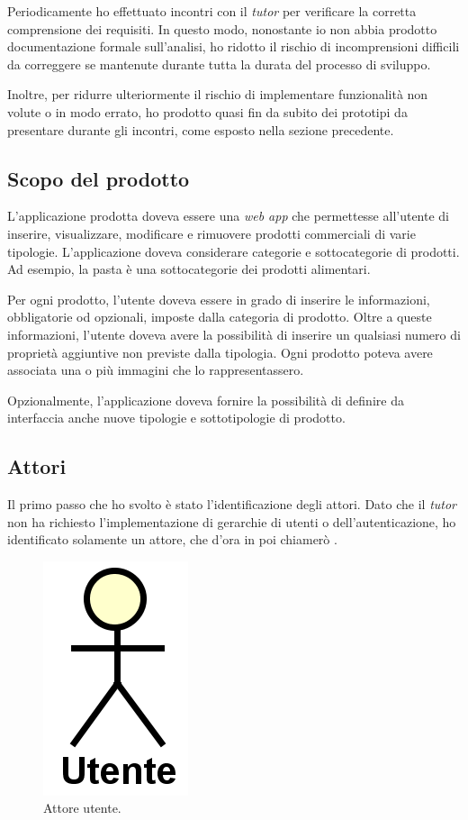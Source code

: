 	Periodicamente ho effettuato incontri con il \textit{tutor} per verificare la corretta comprensione dei requisiti. In questo modo, nonostante io non abbia prodotto documentazione formale sull'analisi, ho ridotto il rischio di incomprensioni difficili da correggere se mantenute durante tutta la durata del processo di sviluppo.
	
	Inoltre, per ridurre ulteriormente il rischio di implementare funzionalità non volute o in modo errato, ho prodotto quasi fin da subito dei prototipi da presentare durante gli incontri, come esposto nella sezione precedente.
	
	\subsection{Scopo del prodotto}
		L'applicazione prodotta doveva essere una \textit{web app} che permettesse all'utente di inserire, visualizzare, modificare e rimuovere prodotti commerciali di varie tipologie. L'applicazione doveva considerare categorie e sottocategorie di prodotti. Ad esempio, la pasta è una sottocategorie dei prodotti alimentari.
		
		Per ogni prodotto, l'utente doveva essere in grado di inserire le informazioni, obbligatorie od opzionali, imposte dalla categoria di prodotto. Oltre a queste informazioni, l'utente doveva avere la possibilità di inserire un qualsiasi numero di proprietà aggiuntive non previste dalla tipologia.
		Ogni prodotto poteva avere associata una o più immagini che lo rappresentassero.
		
		Opzionalmente, l'applicazione doveva fornire la possibilità di definire da interfaccia anche nuove tipologie e sottotipologie di prodotto.
	
	\subsection{Attori}
		Il primo passo che ho svolto è stato l'identificazione degli attori. Dato che il \textit{tutor} non ha richiesto l'implementazione di gerarchie di utenti o dell'autenticazione, ho identificato solamente un attore, che d'ora in poi chiamerò .
		
		\begin{figure}[H]
			\centering
			\includegraphics[scale=0.5]{immagini/utente}
			\caption{Attore utente.}
		\end{figure}
		
